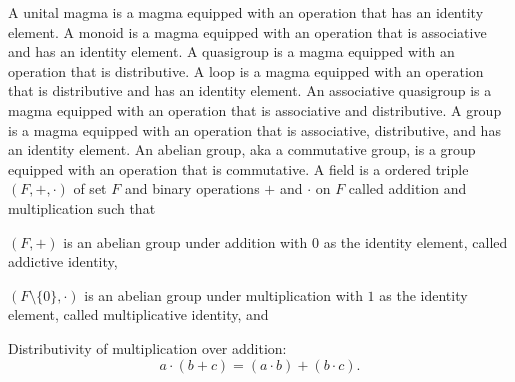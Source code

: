 \documentclass[a4paper,12pt]{article}
\begin{document}
A unital magma is a magma equipped with an operation that has an identity element.
A monoid is a magma equipped with an operation that is associative and has an identity element.
A quasigroup is a magma equipped with an operation that is distributive.
A loop is a magma equipped with an operation that is distributive and has an identity element.
An associative quasigroup is a magma equipped with an operation that is associative and distributive.
A group is a magma equipped with an operation that is associative, distributive, and has an identity element.
An abelian group, aka a commutative group, is a group equipped with an operation that is commutative.
A field is a ordered triple $(F,+,\cdot)$ of set $F$ and binary operations $+$ and $\cdot$ on $F$ called addition and multiplication such that
\bit
\item $(F,+)$ is an abelian group under addition with $0$ as the identity element, called addictive identity,
\item $(F\setminus\{0\},\cdot)$ is an abelian group under multiplication with $1$ as the identity element, called multiplicative identity, and
\item Distributivity of multiplication over addition:
\[a\cdot (b+c)=(a\cdot b)+(b\cdot c).\]
\eit
\end{document}
